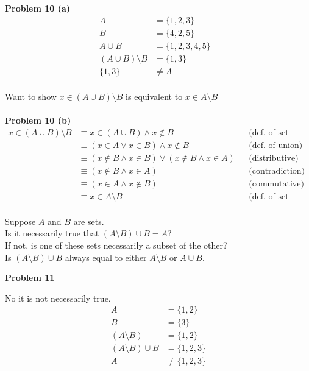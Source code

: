 \textbf{Problem 10 (a)}
\begin{align*}
A &= \{1, 2, 3\} & \\
B &= \{4, 2, 5\} & \\
A \cup B &= \{1, 2, 3, 4, 5\} & \\
(A \cup B) \setminus B &= \{1, 3\} & \\
\{1, 3\} &\not = A & \\
\end{align*}

Want to show $x \in (A \cup B) \setminus B$ is equivalent to $x \in A \setminus B$ \\ \\
\textbf{Problem 10 (b)}
\begin{align*}
x \in (A \cup B) \setminus B 
&\equiv x \in (A \cup B) \wedge x \notin B &&\text{(def. of set difference)} \\
&\equiv (x \in A \vee x \in B) \wedge x \notin B &&\text{(def. of union)} \\
&\equiv (x \notin B \wedge x \in B) \vee (x \notin B \wedge x \in A) &&\text{(distributive)} \\
&\equiv (x \notin B \wedge x \in A) &&\text{(contradiction)} \\
&\equiv (x \in A \wedge x \notin B) &&\text{(commutative)} \\
&\equiv x \in A \setminus B &&\text{(def. of set difference)} \\
\end{align*}

\begin{tcolorbox}[title=Problem 11, breakable]
Suppose $A$ and $B$ are sets. \\
Is it necessarily true that $(A \setminus B) \cup B = A$? \\
If not, is one of these sets necessarily a subset of the other? \\
Is $(A \setminus B) \cup B$ always equal to either $A \setminus B$ or $A \cup B$.
\end{tcolorbox}


\textbf{Problem 11}

No it is not necessarily true.
\begin{align*}
A &= \{1, 2\} \\
B &= \{3\} \\
(A \setminus B) &= \{1, 2\} \\
(A \setminus B) \cup B &= \{1, 2, 3\} \\
A &\not = \{1, 2, 3\}
\end{align*}

